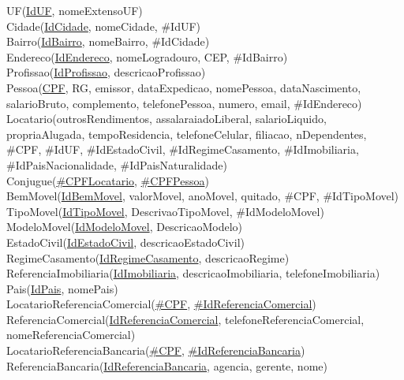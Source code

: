 \documentclass{article}
\begin{document}
        UF(\underline{IdUF}, nomeExtensoUF)
        \\
        Cidade(\underline{IdCidade}, nomeCidade, \#IdUF)
        \\
        Bairro(\underline{IdBairro}, nomeBairro, \#IdCidade)
        \\
        Endereco(\underline{IdEndereco}, nomeLogradouro, CEP, \#IdBairro)
        \\
        Profissao(\underline{IdProfissao}, descricaoProfissao)
        \\
        Pessoa(\underline{CPF}, RG, emissor, dataExpedicao, nomePessoa, dataNascimento, salarioBruto, complemento, telefonePessoa, numero, email, \#IdEndereco)
        \\
        Locatario(outrosRendimentos, assalaraiadoLiberal, salarioLiquido, propriaAlugada, tempoResidencia, telefoneCelular, filiacao, nDependentes, \#CPF, \#IdUF, \#IdEstadoCivil, \#IdRegimeCasamento, \#IdImobiliaria, \#IdPaisNacionalidade, \#IdPaisNaturalidade)
        \\
        Conjugue(\underline{\#CPFLocatario}, \underline{\#CPFPessoa})
        \\
        BemMovel(\underline{IdBemMovel}, valorMovel, anoMovel, quitado, \#CPF, \#IdTipoMovel)
        \\
        TipoMovel(\underline{IdTipoMovel}, DescrivaoTipoMovel, \#IdModeloMovel)
        \\
        ModeloMovel(\underline{IdModeloMovel}, DescricaoModelo)
        \\
        EstadoCivil(\underline{IdEstadoCivil}, descricaoEstadoCivil)
        \\
        RegimeCasamento(\underline{IdRegimeCasamento}, descricaoRegime)
        \\
        ReferenciaImobiliaria(\underline{IdImobiliaria}, descricaoImobiliaria, telefoneImobiliaria)
        \\
        Pais(\underline{IdPais}, nomePais)
        \\
        LocatarioReferenciaComercial(\underline{\#CPF}, \underline{\#IdReferenciaComercial})
        \\
        ReferenciaComercial(\underline{IdReferenciaComercial}, telefoneReferenciaComercial, nomeReferenciaComercial)
        \\
        LocatarioReferenciaBancaria(\underline{\#CPF}, \underline{\#IdReferenciaBancaria})
        \\
        ReferenciaBancaria(\underline{IdReferenciaBancaria}, agencia, gerente, nome)
\end{document}
